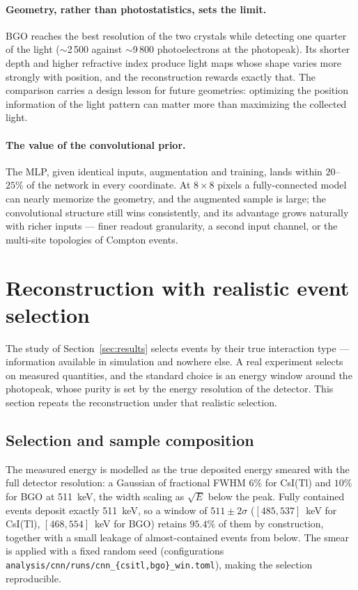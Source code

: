 \documentclass[11pt,a4paper]{article}
\newcommand{\code}[1]{\texttt{#1}}
\newcommand{\csitl}{CsI(Tl)}
\begin{document}
\paragraph{Geometry, rather than photostatistics, sets the limit.} BGO reaches
the best resolution of the two crystals while detecting one quarter of the
light ($\sim$2\,500 against $\sim$9\,800 photoelectrons at the photopeak). Its
shorter depth and higher refractive index produce light maps whose shape
varies more strongly with position, and the reconstruction rewards exactly
that. The comparison carries a design lesson for future geometries: optimizing
the position information of the light pattern can matter more than maximizing
the collected light.

\paragraph{The value of the convolutional prior.} The MLP, given identical
inputs, augmentation and training, lands within $20$--$25\%$ of the network in
every coordinate. At $8\times8$ pixels a fully-connected model can nearly
memorize the geometry, and the augmented sample is large; the convolutional
structure still wins consistently, and its advantage grows naturally with
richer inputs --- finer readout granularity, a second input channel, or the
multi-site topologies of Compton events.

\section{Reconstruction with realistic event selection}
\label{sec:window}

The study of Section~\ref{sec:results} selects events by their true
interaction type --- information available in simulation and nowhere else. A
real experiment selects on measured quantities, and the standard choice is an
energy window around the photopeak, whose purity is set by the energy
resolution of the detector. This section repeats the reconstruction under that
realistic selection.

\subsection{Selection and sample composition}

The measured energy is modelled as the true deposited energy smeared with the
full detector resolution: a Gaussian of fractional FWHM $6\%$ for \csitl{} and
$10\%$ for BGO at 511~keV, the width scaling as $\sqrt{E}$ below the peak.
Fully contained events deposit exactly 511~keV, so a window of
$511 \pm 2\sigma$ ($[485, 537]$~keV for \csitl{}, $[468, 554]$~keV for BGO)
retains $95.4\%$ of them by construction, together with a small leakage of
almost-contained events from below. The smear is applied with a fixed random
seed (configurations \code{analysis/cnn/runs/cnn\_\{csitl,bgo\}\_win.toml}),
making the selection reproducible.
\end{document}
